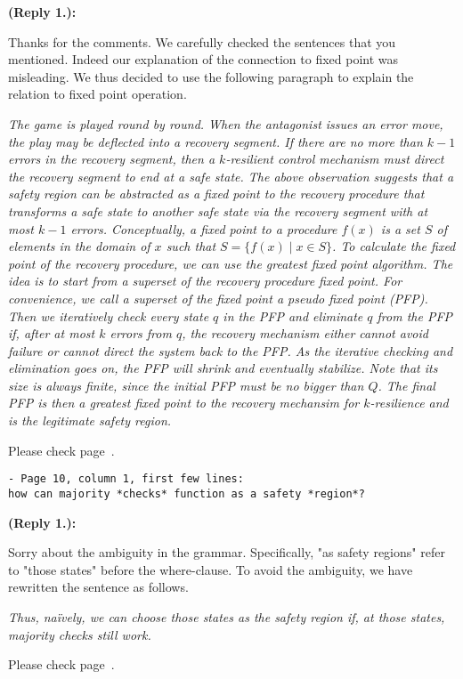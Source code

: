 \documentclass[times,10pt,twocolumn]{article}
\newcounter{cabbage0}
\newcounter{cabbage1}
\newcounter{cabbage2}
\newcounter{cabbage3}
\newcounter{bean0}
\newcounter{bean1}
\newcounter{bean2}
\newcounter{bean3}
\newcounter{bean4}
\newcounter{bean5}
\newcounter{bean6}
\newenvironment{reply1}{\begin{list}{\bf (Reply 1.\arabic{bean1}):} 
        {\usecounter{bean1}\setcounter{bean1}{\value{cabbage1}} \item \setcounter{cabbage1}{\value{bean1}} 
        }
}{\end{list}}
\begin{document}
\begin{reply1} 
Thanks for the comments. 
We carefully checked the sentences that you mentioned.  
Indeed our explanation of the connection to fixed point was misleading. 
We thus decided to use the following paragraph to explain the relation to 
fixed point operation. 
\begin{center} 
\parbox{140mm}{\em 
The game is played round by round. 
When the antagonist issues an error move, 
the play may be deflected into a recovery segment.  
If there are no more than $k-1$ errors in the recovery segment, 
then a $k$-resilient control mechanism must direct the recovery segment
to end at a safe state. 
The above observation suggests that 
a safety region can be abstracted as a fixed point 
to the recovery procedure 
that transforms a safe state to another safe state via the recovery segment 
with at most $k-1$ errors. 
Conceptually, a fixed point to a procedure $f(x)$ is a set $S$ of elements 
in the domain of $x$ such that $S=\{f(x)\mid x\in S\}$.  
To calculate the fixed point of the recovery procedure, 
we can use the greatest fixed point algorithm.  
The idea is to start from a superset of the recovery procedure fixed point. 
For convenience, we call a superset of the fixed point a {\em pseudo fixed point} 
({\em PFP}).  
Then we iteratively check every state $q$ in the PFP and eliminate 
$q$ from the PFP if, after at most $k$ errors from $q$, 
the recovery mechanism either cannot avoid failure or 
cannot direct the system back to the PFP. 
As the iterative checking and elimination goes on, 
the PFP will shrink and eventually stabilize.
Note that its size is always finite, 
since the initial PFP must be no bigger than $Q$.  
The final PFP is then a greatest fixed point to the recovery mechansim for 
$k$-resilience and is the legitimate safety region.  
}
\end{center} 
Please check page~\pageref{reply1.fixed.point.explanation}.  
\end{reply1} 
\begin{verbatim} 
- Page 10, column 1, first few lines: 
how can majority *checks* function as a safety *region*?
\end{verbatim}
\begin{reply1} 
Sorry about the ambiguity in the grammar. 
Specifically, "as safety regions" refer to "those states" before the 
where-clause.  
To avoid the ambiguity, we have rewritten the sentence as follows. 
\begin{center}
\parbox{140mm}{\em 
Thus, na\"ively, we can choose those states as the safety region
if, 
at those states, majority checks still work.  
}
\end{center} 
Please check page~\pageref{reply1.majority.checks.as.safety.regions}.  
\end{reply1}
\end{document}

